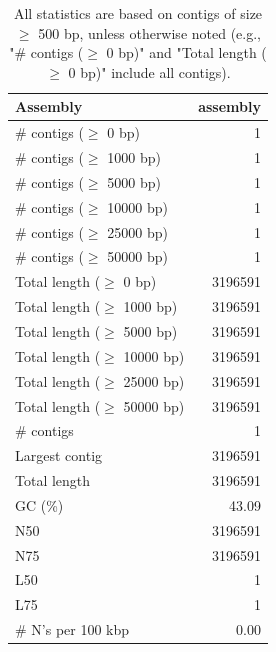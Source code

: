 \documentclass[12pt,a4paper]{article}
\begin{document}
\begin{table}[ht]
\begin{center}
\caption{All statistics are based on contigs of size $\geq$ 500 bp, unless otherwise noted (e.g., "\# contigs ($\geq$ 0 bp)" and "Total length ($\geq$ 0 bp)" include all contigs).}
\begin{tabular}{|l*{1}{|r}|}
\hline
Assembly & assembly \\ \hline
\# contigs ($\geq$ 0 bp) & 1 \\ \hline
\# contigs ($\geq$ 1000 bp) & 1 \\ \hline
\# contigs ($\geq$ 5000 bp) & 1 \\ \hline
\# contigs ($\geq$ 10000 bp) & 1 \\ \hline
\# contigs ($\geq$ 25000 bp) & 1 \\ \hline
\# contigs ($\geq$ 50000 bp) & 1 \\ \hline
Total length ($\geq$ 0 bp) & 3196591 \\ \hline
Total length ($\geq$ 1000 bp) & 3196591 \\ \hline
Total length ($\geq$ 5000 bp) & 3196591 \\ \hline
Total length ($\geq$ 10000 bp) & 3196591 \\ \hline
Total length ($\geq$ 25000 bp) & 3196591 \\ \hline
Total length ($\geq$ 50000 bp) & 3196591 \\ \hline
\# contigs & 1 \\ \hline
Largest contig & 3196591 \\ \hline
Total length & 3196591 \\ \hline
GC (\%) & 43.09 \\ \hline
N50 & 3196591 \\ \hline
N75 & 3196591 \\ \hline
L50 & 1 \\ \hline
L75 & 1 \\ \hline
\# N's per 100 kbp & 0.00 \\ \hline
\end{tabular}
\end{center}
\end{table}
\end{document}
